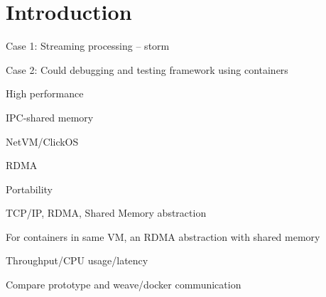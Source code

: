 \section{Introduction} \label{sec:introduction}



Case 1: Streaming processing – storm

Case 2: Could debugging and testing framework using containers


High performance

IPC-shared memory

NetVM/ClickOS

RDMA 

Portability

TCP/IP, RDMA, Shared Memory abstraction


For containers in same VM, an RDMA abstraction with shared memory


Throughput/CPU usage/latency

Compare prototype and weave/docker communication 
